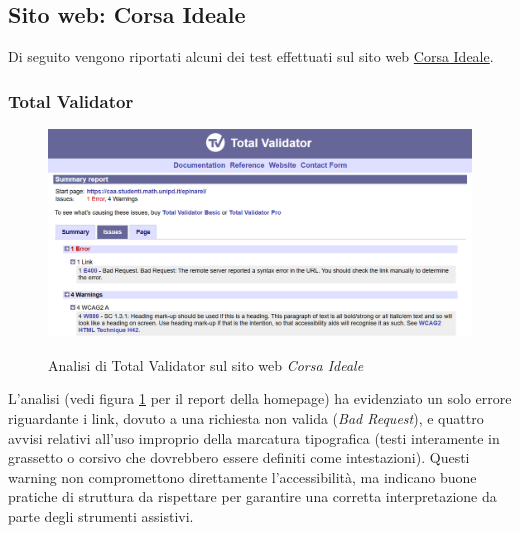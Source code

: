 \subsection{Sito web: Corsa Ideale}
\noindent Di seguito vengono riportati alcuni dei test effettuati sul sito web \href{https://caa.studenti.math.unipd.it/epinarel/}{Corsa Ideale}.
\subsubsection{Total Validator}
\begin{figure}[H]
    \centering
    \includegraphics[width=0.8\linewidth, alt={Screenshot dell'analisi di Total Validator sul sito web Corsa Ideale}]{img/TV_corsaideale.png}
    \caption{Analisi di Total Validator sul sito web \textit{Corsa Ideale}}\label{fig:TV_corsaideale}
\end{figure}

\noindent \noindent L’analisi (vedi figura \ref{fig:TV_corsaideale} per il report della homepage) ha evidenziato un solo errore riguardante i link, dovuto a una richiesta non valida (\textit{Bad Request}), e quattro avvisi relativi all’uso improprio della marcatura tipografica (testi interamente in grassetto o corsivo che dovrebbero essere definiti come intestazioni). Questi warning non compromettono direttamente l’accessibilità, ma indicano buone pratiche di struttura da rispettare per garantire una corretta interpretazione da parte degli strumenti assistivi.

